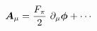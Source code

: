 \begin{equation}
\mbox{\boldmath$A$}_\mu =\frac{F_\pi}{2}~\partial_\mu \mbox{\boldmath$\phi$}+\cdots
\end{equation}

